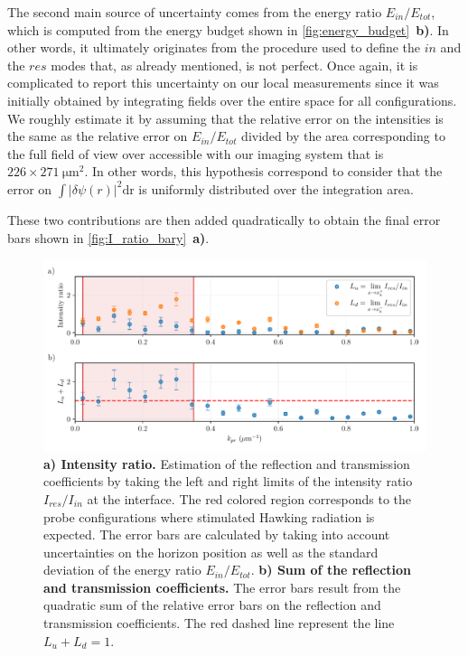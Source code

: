 The second main source of uncertainty comes from the energy ratio $E_{in}/E_{tot}$, which is computed from the energy budget shown in \autoref{fig:energy_budget}~\textbf{b)}.
In other words, it ultimately originates from the procedure used to define the $in$ and the $res$ modes that, as already mentioned, is not perfect.
Once again, it is complicated to report this uncertainty on our local measurements since it was initially obtained by integrating fields over the entire space for all configurations.
We roughly estimate it by assuming that the relative error on the intensities is the same as the relative error on $E_{in}/E_{tot}$ divided by the area corresponding to the full field of view over accessible with our imaging system that is $226\times\SI{271}{ \micro \meter \squared}$. In other words, this hypothesis correspond to consider that the error on 
$\int |\delta \psi(r)|^2\mathrm{dr}$ is uniformly distributed over the integration area.

These two contributions are then added quadratically to obtain the final error bars shown in \autoref{fig:I_ratio_bary}~\textbf{a)}.

\begin{figure}
    \centering
    \includegraphics[width=1\textwidth]{chap_stimulated_hawking/fig/I_ratio_bary.pdf}
    \caption{\textbf{a) Intensity ratio.} Estimation of the reflection and transmission coefficients by taking the left and right limits of the intensity ratio $I_{res}/I_{in}$ at the interface. 
    The red colored region corresponds to the probe configurations where stimulated Hawking radiation is expected. The error bars are calculated by taking into account uncertainties on the horizon position as well as the standard deviation of the energy ratio $E_{in}/E_{tot}$.
    \textbf{b) Sum of the reflection and transmission coefficients.} The error bars result from the quadratic sum of the relative error bars on the reflection and transmission coefficients. The red dashed line represent the line $L_u+L_d=1$.}
    \label{fig:I_ratio_bary}
\end{figure}

